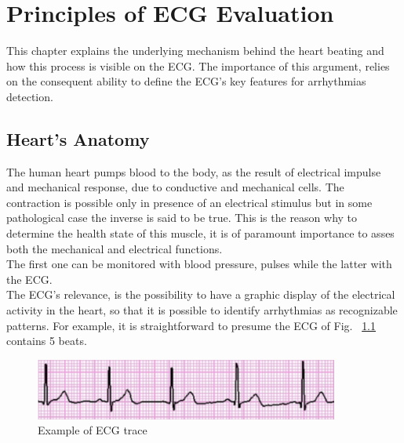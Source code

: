 \documentclass[LaM,binding=0.6cm]{sapthesis}
\begin{document}
\chapter{Principles of ECG Evaluation}
This chapter explains the underlying mechanism behind the heart beating and how this process is visible on the ECG. The importance of this argument, relies on the consequent ability to define the ECG's key features for arrhythmias detection.

\section{Heart's Anatomy }

The human heart pumps blood to the body, as the result of electrical impulse and mechanical response, due to conductive and mechanical cells. The contraction is possible only in presence of an electrical stimulus but in some pathological case the inverse is said to be true. This is the reason why to determine the health state of this muscle, it is of paramount importance to asses both the mechanical and electrical functions.\\The first one can be monitored with blood pressure, pulses while the latter with the ECG.\\The ECG's relevance, is the possibility to have a graphic display of the electrical activity in the heart, so that it is possible to identify arrhythmias as recognizable patterns. For example, it is straightforward to presume the ECG of Fig. ~\ref{fig:ecgex} contains 5 beats.
\begin{figure}[H] \centering
	\includegraphics[width=100mm,scale=0.7]{ecgtrace}
	\caption{Example of ECG trace}
	\label{fig:ecgex}
\end{figure}
\end{document}
